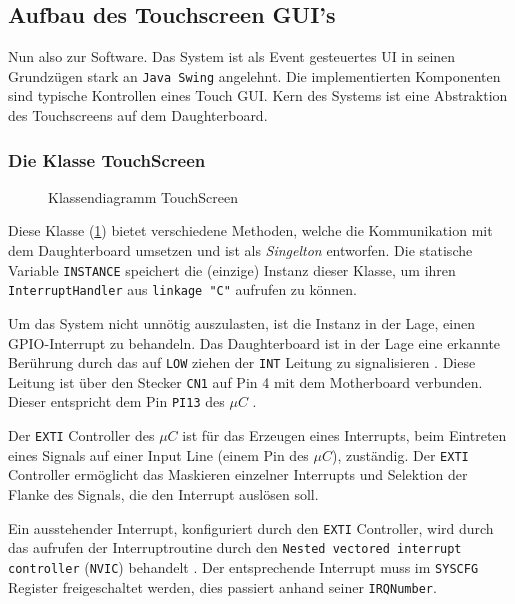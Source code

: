 \subsection{Aufbau des Touchscreen GUI's}
	Nun also zur Software. 
	Das System ist als Event gesteuertes UI in seinen Grundzügen stark an \texttt{Java Swing} angelehnt.
	Die implementierten Komponenten sind typische Kontrollen eines Touch GUI.
	Kern des Systems ist eine Abstraktion des Touchscreens auf dem Daughterboard.
	
	\subsubsection{Die Klasse TouchScreen}\label{sec:touchscreen_class}
		\begin{figure}
			\scalebox{0.75}{
				\begin{tikzpicture}
					
				\end{tikzpicture}
			}
			\caption{Klassendiagramm TouchScreen}
			\label{uml-touchscreen}
		\end{figure}
		Diese Klasse (\ref{uml-touchscreen}) bietet verschiedene Methoden, welche die Kommunikation mit dem Daughterboard umsetzen und ist als \emph{Singelton} entworfen.
		Die statische Variable \texttt{INSTANCE} speichert die (einzige) Instanz dieser Klasse, um ihren \texttt{InterruptHandler} aus \texttt{linkage "C"} aufrufen zu können.
		
		Um das System nicht unnötig auszulasten, ist die Instanz in der Lage, einen GPIO-Interrupt zu behandeln.
		Das Daughterboard ist in der Lage eine erkannte Berührung durch das auf \texttt{LOW} ziehen der \texttt{INT} Leitung zu signalisieren \cite[8\psq]{ts-userManual}.
		Diese Leitung ist über den Stecker \texttt{CN1} auf Pin 4 mit dem Motherboard verbunden. Dieser entspricht dem Pin \texttt{PI13} des $\mu C$ \cite[27\psq]{disco-userManual}.
		
		Der \texttt{EXTI} Controller des $\mu C$ ist für das Erzeugen eines Interrupts, beim Eintreten eines Signals auf einer Input Line (einem Pin des $\mu C$), zuständig.
		Der \texttt{EXTI} Controller ermöglicht das Maskieren einzelner Interrupts und Selektion der Flanke des Signals, die den Interrupt auslösen soll. \cite[319\psqq]{stm32_refManual}
		
		Ein ausstehender Interrupt, konfiguriert durch den \texttt{EXTI} Controller, wird durch das aufrufen der Interruptroutine durch den \texttt{Nested vectored interrupt controller} (\texttt{NVIC}) behandelt \cite[313\psqq]{stm32_refManual}.
		Der entsprechende Interrupt muss im \texttt{SYSCFG} Register freigeschaltet werden, dies passiert anhand seiner \texttt{IRQNumber}.
		
